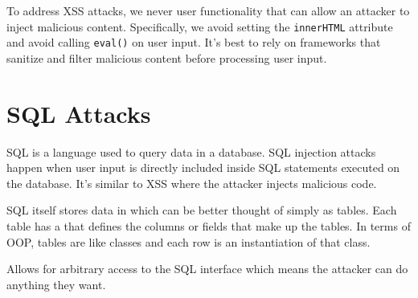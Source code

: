To address XSS attacks, we never user functionality that can allow an attacker to inject malicious content. Specifically, we avoid setting the \texttt{innerHTML} attribute and avoid calling \texttt{eval()} on user input. It's best to rely on frameworks that sanitize and filter malicious content before processing user input.

\section{SQL Attacks}
SQL is a language used to query data in a database. SQL injection attacks happen when user input is directly included inside SQL statements executed on the database. It's similar to XSS where the attacker injects malicious code.

SQL itself stores data in  which can be better thought of simply as tables. Each table has a  that defines the columns or fields that make up the tables. In terms of OOP, tables are like classes and each row is an instantiation of that class.



Allows for arbitrary access to the SQL interface which means the attacker can do anything they want.
